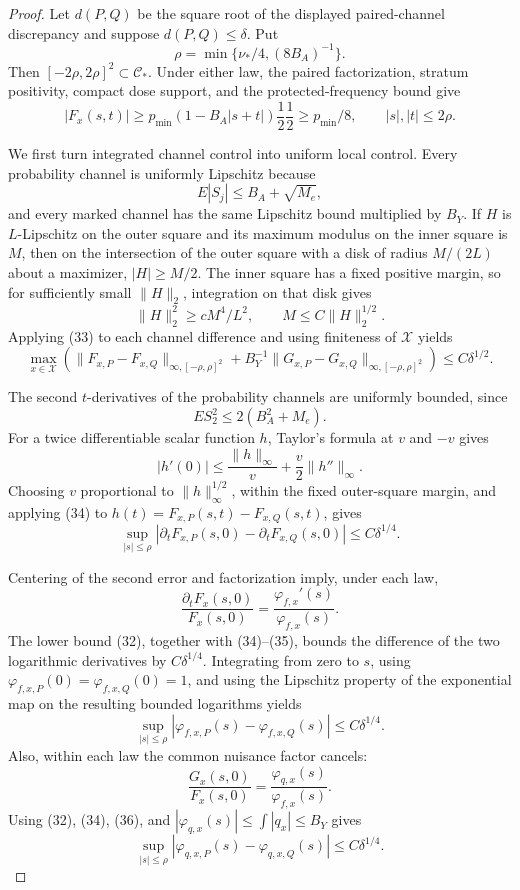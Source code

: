 \documentclass{article}
\begin{document}
\begin{proof}
Let \(d(P,Q)\) be the square root of the displayed paired-channel discrepancy and suppose \(d(P,Q)\le\delta\).  Put
\[
\rho=\min\{\nu_*/4,(8B_A)^{-1}\}.
\]
Then \([-2\rho,2\rho]^2\subset\mathcal C_*\).  Under either law, the paired factorization, stratum positivity, compact dose support, and the protected-frequency bound give
\[
|F_x(s,t)|
\ge p_{\min}\left(1-B_A|s+t|\right)\frac12\frac12
\ge p_{\min}/8,
\qquad |s|,|t|\le2\rho. \tag{32}
\]

We first turn integrated channel control into uniform local control.  Every probability channel is uniformly Lipschitz because
\[
E|S_j|\le B_A+\sqrt{M_e},
\]
and every marked channel has the same Lipschitz bound multiplied by \(B_Y\).  If \(H\) is \(L\)-Lipschitz on the outer square and its maximum modulus on the inner square is \(M\), then on the intersection of the outer square with a disk of radius \(M/(2L)\) about a maximizer, \(|H|\ge M/2\).  The inner square has a fixed positive margin, so for sufficiently small \(\|H\|_2\), integration on that disk gives
\[
\|H\|_2^2\ge cM^4/L^2,
\qquad M\le C\|H\|_2^{1/2}. \tag{33}
\]
Applying (33) to each channel difference and using finiteness of \(\mathcal X\) yields
\[
\max_{x\in\mathcal X}\left(
\|F_{x,P}-F_{x,Q}\|_{\infty,[-\rho,\rho]^2}
+B_Y^{-1}\|G_{x,P}-G_{x,Q}\|_{\infty,[-\rho,\rho]^2}
\right)\le C\delta^{1/2}. \tag{34}
\]

The second \(t\)-derivatives of the probability channels are uniformly bounded, since
\[
E S_2^2\le2(B_A^2+M_e).
\]
For a twice differentiable scalar function \(h\), Taylor's formula at \(v\) and \(-v\) gives
\[
|h'(0)|\le \frac{\|h\|_\infty}{v}+\frac v2\|h''\|_\infty.
\]
Choosing \(v\) proportional to \(\|h\|_\infty^{1/2}\), within the fixed outer-square margin, and applying (34) to \(h(t)=F_{x,P}(s,t)-F_{x,Q}(s,t)\), gives
\[
\sup_{|s|\le\rho}
|\partial_tF_{x,P}(s,0)-\partial_tF_{x,Q}(s,0)|
\le C\delta^{1/4}. \tag{35}
\]

Centering of the second error and factorization imply, under each law,
\[
\frac{\partial_tF_x(s,0)}{F_x(s,0)}
=\frac{\varphi_{f,x}'(s)}{\varphi_{f,x}(s)}.
\]
The lower bound (32), together with (34)--(35), bounds the difference of the two logarithmic derivatives by \(C\delta^{1/4}\).  Integrating from zero to \(s\), using \(\varphi_{f,x,P}(0)=\varphi_{f,x,Q}(0)=1\), and using the Lipschitz property of the exponential map on the resulting bounded logarithms yields
\[
\sup_{|s|\le\rho}
|\varphi_{f,x,P}(s)-\varphi_{f,x,Q}(s)|
\le C\delta^{1/4}. \tag{36}
\]
Also, within each law the common nuisance factor cancels:
\[
\frac{G_x(s,0)}{F_x(s,0)}
=\frac{\varphi_{q,x}(s)}{\varphi_{f,x}(s)}.
\]
Using (32), (34), (36), and \(|\varphi_{q,x}(s)|\le\int|q_x|\le B_Y\) gives
\[
\sup_{|s|\le\rho}
|\varphi_{q,x,P}(s)-\varphi_{q,x,Q}(s)|
\le C\delta^{1/4}. \tag{37}
\]


\end{proof}
\end{document}
